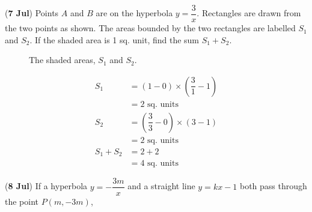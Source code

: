 \documentclass[12pt,answers]{exam}
\renewcommand{\frac}[2]{\dfrac{#1}{#2}}
\newcommand{\qndate}[2]{(\textbf{#1 #2})}
\begin{document}
\begin{questions}
	\question \qndate{7}{Jul} Points $A$ and $B$ are on the hyperbola $y = \frac{3}{x}$.
	Rectangles are drawn from the two points as shown. The areas bounded by the two
	rectangles are labelled $S_1$ and $S_2$. If the shaded area is 1 sq. unit, find
	the sum $S_1 + S_2$.
	\begin{figure}[htpb]
		\centering
		\caption{The shaded areas, $S_1$ and $S_2$.}
		\label{fig:0707_Hyper}
	\end{figure}
	\begin{solution}
		\begin{align*}
			S_1       & = \left(1 - 0\right) \times \left(\frac{3}{1}-1\right)   \\
			          & = 2 \text{ sq. units}                                    \\
			S_2       & = \left(\frac{3}{3} - 0\right) \times \left(3 - 1\right) \\
			          & = 2 \text{ sq. units}                                    \\
			S_1 + S_2 & = 2 + 2                                                  \\
			          & = 4 \text{ sq. units}
		\end{align*}
	\end{solution}

	\question \qndate{8}{Jul} If a hyperbola $y = -\frac{3m}{x}$ and a straight line
	$y = kx-1$ both pass through the point $P(m,-3m)$,
	\begin{parts}

\end{parts}
\end{questions}
\end{document}
